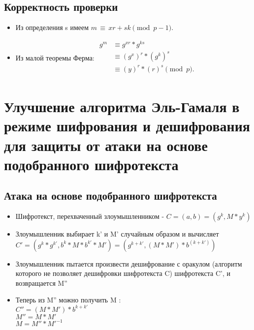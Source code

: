 \documentclass[a4paper]{article}
\begin{document}
\subsection*{Корректность проверки}

\begin{itemize}
    \item Из определения s имеем ${m\,\equiv \,xr+sk{\pmod {p-1}}.}$
    \item Из малой теоремы Ферма: ${{\begin{aligned}g^{m}&\equiv g^{xr} * g^{ks}\\&\equiv (g^{x})^{r} * (g^{k})^{s}\\&\equiv (y)^{r} * (r)^{s}{\pmod {p}}.\\\end{aligned}}}$
\end{itemize}

\section*{Улучшение алгоритма Эль-Гамаля в режиме шифрования и дешифрования для защиты от атаки на основе подобранного шифротекста}
\subsection*{Атака на основе подобранного шифротекста}
\begin{itemize}
    \item Шифротекст, перехваченный злоумышленником - $C = (a, b) = (g^k, M * y^k)$
    \item Злоумышленник выбирает k' и M' случайным образом и вычисляет \\
    $C' = (g^k * g^{k'}, b^k * M * b^{k'} * M') = (g^{k + k'}, (M*M') * b ^ (k + k'))$
    \item Злоумышленник пытается произвести дешифрование с оракулом (алгоритм которого не позволяет дешифровки шифротекста C) шифротекста C', и возвращается M''
    \item Теперь из M'' можно получить M :\\
    $C'' = (M * M') * b ^ {k + k'}$\\
    $M'' = M * M'$\\
    $M = M'' * M'^{-1}$
\end{itemize}
\end{document}
